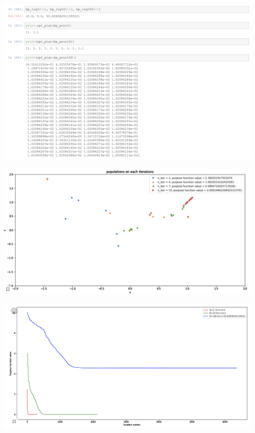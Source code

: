 \documentclass[10pt,a4paper]{article}
\begin{document}
	\includegraphics[width= 0.9 \textwidth, keepaspectratio]{img/18}
	
	\includegraphics[width=  \textwidth, keepaspectratio]{img/19}
	
	\includegraphics[width=  \textwidth, keepaspectratio]{img/20}
	
\end{document}
